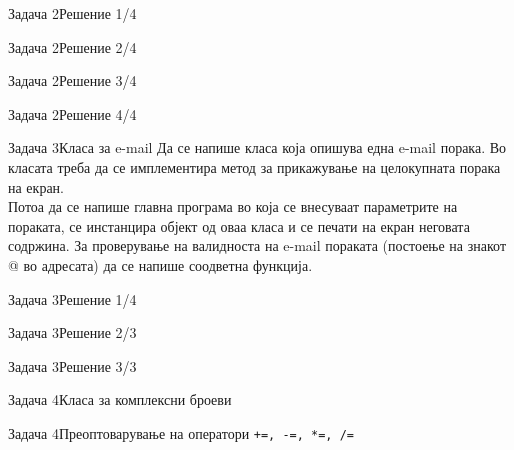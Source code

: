 \begin{frame}[fragile]{Задача 2}{Решение 1/4}

\end{frame}

\begin{frame}[fragile]{Задача 2}{Решение 2/4}

\end{frame}

\begin{frame}[fragile]{Задача 2}{Решение 3/4}

\end{frame}

\begin{frame}[fragile]{Задача 2}{Решение 4/4}

\end{frame}

\begin{frame}{Задача 3}{Класа за e-mail}
Да се напише класа која опишува една e-mail порака. Во класата треба да се
имплементира метод за прикажување на целокупната порака на екран.\\
Потоа да се напише главна програма во која се внесуваат параметрите на пораката,
се инстанцира објект од оваа класа и се печати на екран неговата содржина. За
проверување на валидноста на e-mail пораката (постоење на знакот @ во адресата)
да се напише соодветна функција.
\end{frame}

\begin{frame}[fragile]{Задача 3}{Решение 1/4}

\end{frame}

\begin{frame}[fragile]{Задача 3}{Решение 2/3}

\end{frame}

\begin{frame}[fragile]{Задача 3}{Решение 3/3}

\end{frame}

\begin{frame}[fragile]{Задача 4}{Класа за комплексни броеви}

\end{frame}

\begin{frame}[fragile]{Задача 4}{Преоптоварување на оператори
\texttt{+=, -=, *=, /=}}

\end{frame}


